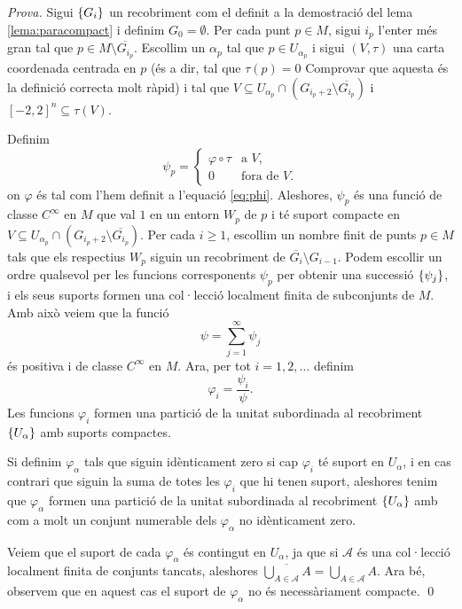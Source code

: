 {\color{green!50!black} \textit{Prova.} 
Sigui $\{G_i\}$ un recobriment com el definit a la demostració del lema \ref{lema:paracompact} i definim $G_0=\emptyset$. Per cada punt $p\in M$, sigui $i_p$ l'enter més gran tal que $p\in M\setminus \overline{G_{i_p}}$. Escollim un $\alpha_p$ tal que $p\in U_{\alpha_p}$ i sigui $(V,\tau)$ una carta coordenada centrada en $p$ (és a dir, tal que $\tau(p)=0$ {\color{blue} Comprovar que aquesta és la definició correcta molt ràpid}) i tal que $V\subseteq U_{\alpha_p}\cap(G_{i_p+2}\setminus \overline{G_{i_p}})$ i $[-2,2]^n\subseteq\tau(V)$.

Definim 
\begin{equation*}
    \psi_p = \begin{cases}
        \varphi\circ\tau & \text{a } V, \\
        0 & \text{fora de } V.
    \end{cases}
\end{equation*}
on $\varphi$ és tal com l'hem definit a l'equació \ref{eq:phi}. Aleshores, $\psi_p$ és una funció de classe $C^\infty$ en $M$ que val $1$ en un entorn $W_p$ de $p$ i té suport compacte en $V\subseteq U_{\alpha_p}\cap(G_{i_p+2}\setminus \overline{G_{i_p}})$. Per cada $i\ge1$, escollim un nombre finit de punts $p\in M$ tals que els respectius $W_p$ siguin un recobriment de $\overline{G_i}\setminus G_{i-1}$. Podem escollir un ordre qualsevol per les funcions corresponents $\psi_p$ per obtenir una successió $\{\psi_j\}$, i els seus suports formen una col·lecció localment finita de subconjunts de $M$. Amb això veiem que la funció 
\begin{equation*}
    \psi = \sum_{j=1}^\infty \psi_j
\end{equation*}
és positiva i de classe $C^\infty$ en $M$. Ara, per tot $i=1,2,\dots$ definim 
\begin{equation*}
    \varphi_i = \frac{\psi_i}{\psi}.
\end{equation*}
Les funcions $\varphi_i$ formen una partició de la unitat subordinada al recobriment $\{U_\alpha\}$ amb suports compactes.

Si definim $\varphi_\alpha$ tals que siguin idènticament zero si cap $\varphi_i$ té suport en $U_\alpha$, i en cas contrari que siguin la suma de totes les $\varphi_i$ que hi tenen suport, aleshores tenim que $\varphi_\alpha$ formen una partició de la unitat subordinada al recobriment $\{U_\alpha\}$ amb com a molt un conjunt numerable dels $\varphi_\alpha$ no idènticament zero.

Veiem que el suport de cada $\varphi_\alpha$ és contingut en $U_\alpha$, ja que si $\mathcal A$ és una col·lecció localment finita de conjunts tancats, aleshores $\overline{\bigcup_{A\in \mathcal A} A} = \bigcup_{A\in \mathcal A} A$. Ara bé, observem que en aquest cas el suport de $\varphi_\alpha$ no és necessàriament compacte.
\qed
}
